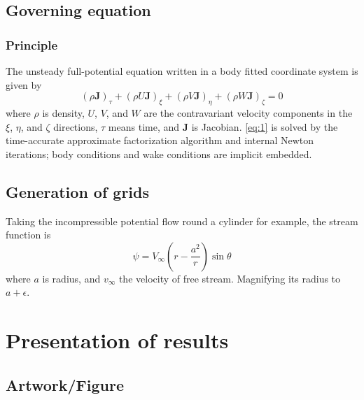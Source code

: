 \documentclass{cja}
\begin{document}
\subsection{Governing equation}

\subsubsection{Principle}

The unsteady full-potential equation written in a body fitted coordinate system is given by
\begin{equation}
  (\rho \bm{J})_\tau + (\rho U \bm{J})_\xi + (\rho V \bm{J})_\eta + (\rho W \bm{J})_\zeta = 0
  \label{eq:1}
\end{equation}
where $\rho$ is density, $U$, $V$, and $W$ are the contravariant velocity components in the $\xi$, $\eta$, and $\zeta$ directions, $\tau$ means time, and $\bm{J}$ is Jacobian.
\cref{eq:1} is solved by the time-accurate approximate factorization algorithm and internal Newton iterations\cite{strunk1979elements}; body conditions and wake conditions are implicit embedded.


\subsection{Generation of grids}

Taking the incompressible potential flow round a cylinder for example, the stream function is
\begin{equation}
  \psi = V_\infty \left( r - \frac{a^2}{r} \right) \sin \theta
\end{equation}
where $a$ is radius, and $v_\infty$ the velocity of free stream. Magnifying its radius to $a + \epsilon$.



\section{Presentation of results}
\label{sec:results}

\subsection{Artwork/Figure}
\end{document}

